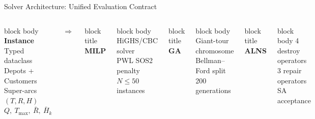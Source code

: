 \documentclass[aspectratio=169,t]{beamer}
\begin{document}
\begin{frame}{Solver Architecture: Unified Evaluation Contract}

\begin{columns}[c]

\begin{beamercolorbox}[rounded=true,shadow=false,
    wd=\linewidth,sep=4pt]{block body}
  \centering\scriptsize
  \textbf{\textcolor{iitblue}{Instance}}\\[3pt]
  Typed dataclass\\
  Depots + Customers\\
  Super-arcs $(T,R,H)$\\
  $Q,\ T_{\max},\ \bar{R},\ \bar{H}_k$
\end{beamercolorbox}

\centering
\Large$\Rightarrow$

\begin{beamercolorbox}[rounded=true,wd=\linewidth,sep=3pt,
    colsep*=2pt]{block title}
  \centering\scriptsize\textbf{MILP}
\end{beamercolorbox}
\begin{beamercolorbox}[rounded=true,wd=\linewidth,sep=3pt]{block body}
  \centering\scriptsize HiGHS/CBC solver\\
  PWL SOS2 penalty\\
  $N \leq 50$ instances
\end{beamercolorbox}
\vspace{4pt}
\begin{beamercolorbox}[rounded=true,wd=\linewidth,sep=3pt,
    colsep*=2pt]{block title}
  \centering\scriptsize\textbf{GA}
\end{beamercolorbox}
\begin{beamercolorbox}[rounded=true,wd=\linewidth,sep=3pt]{block body}
  \centering\scriptsize Giant-tour chromosome\\
  Bellman--Ford split\\
  200 generations
\end{beamercolorbox}
\vspace{4pt}
\begin{beamercolorbox}[rounded=true,wd=\linewidth,sep=3pt,
    colsep*=2pt]{block title}
  \centering\scriptsize\textbf{ALNS}
\end{beamercolorbox}
\begin{beamercolorbox}[rounded=true,wd=\linewidth,sep=3pt]{block body}
  \centering\scriptsize 4 destroy operators\\
  3 repair operators\\
  SA acceptance
\end{beamercolorbox}


\end{columns}
\end{frame}
\end{document}

